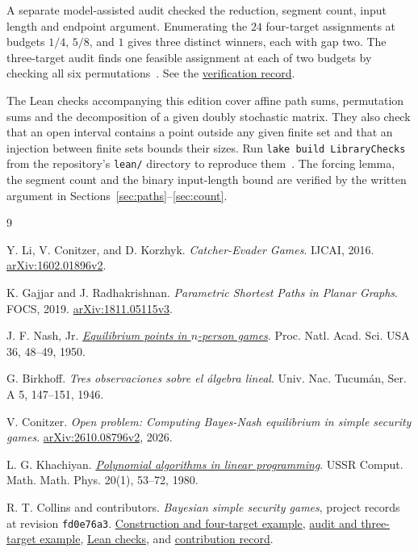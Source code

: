 \documentclass[11pt,letterpaper]{article}
\theoremstyle{definition}
\newcommand{\recordlink}[2]{\href{https://github.com/robbiemu/bayesian-simple-security-games/blob/fd0e76a3090ffaf4b3f85cd166fb57b69285d3be/#1}{#2}}
\begin{document}
A separate model-assisted audit checked the reduction, segment count,
input length and endpoint argument. Enumerating the \(24\) four-target
assignments at budgets \(1/4\), \(5/8\), and \(1\) gives three distinct
winners, each with gap two. The three-target audit finds one feasible
assignment at each of two budgets by checking all six permutations~\cite{record}.
See the \href{https://github.com/robbiemu/bayesian-simple-security-games/blob/3cbb839a967a8c81084f3cfeb496314fb3628ca9/papers/fixed-flow-continuation-lower-bound-verification.md}{verification record}.

The Lean checks accompanying this edition cover affine path sums,
permutation sums and the decomposition of a given doubly stochastic
matrix. They also check that an open interval contains a point outside any
given finite set and that an injection between finite sets bounds their
sizes. Run \texttt{lake build LibraryChecks} from the repository's
\texttt{lean/} directory to reproduce them~\cite{record}. The forcing
lemma, the segment count and the binary input-length bound are verified
by the written argument in Sections~\ref{sec:paths}--\ref{sec:count}.

\begin{thebibliography}{9}
\small
\raggedright
\setlength{\itemsep}{.25em}
Y. Li, V. Conitzer, and D. Korzhyk.
\emph{Catcher-Evader Games}. IJCAI, 2016.
\href{https://arxiv.org/pdf/1602.01896v2}{arXiv:1602.01896v2}.

K. Gajjar and J. Radhakrishnan.
\emph{Parametric Shortest Paths in Planar Graphs}. FOCS, 2019.
\href{https://arxiv.org/pdf/1811.05115v3}{arXiv:1811.05115v3}.

J. F. Nash, Jr. \href{https://doi.org/10.1073/pnas.36.1.48}{\emph{Equilibrium
points in \(n\)-person games}}. Proc. Natl. Acad. Sci. USA 36, 48--49, 1950.

G. Birkhoff. \emph{Tres observaciones sobre el \'algebra lineal}.
Univ. Nac. Tucum\'an, Ser. A 5, 147--151, 1946.

V. Conitzer. \emph{Open problem: Computing Bayes-Nash equilibrium in
simple security games}.
\href{https://arxiv.org/pdf/2610.08796v2}{arXiv:2610.08796v2}, 2026.

L. G. Khachiyan. \href{https://www.mathnet.ru/eng/zvmmf5239}{\emph{Polynomial
algorithms in linear programming}}. USSR Comput. Math. Math. Phys. 20(1), 53--72, 1980.

R. T. Collins and contributors. \emph{Bayesian simple security games},
project records at revision \texttt{fd0e76a3}.
\recordlink{notes/B3f-forced-flow-switches.md}{Construction and four-target example},
\recordlink{notes/B3g-lower-bound-audit.md}{audit and three-target example},
\recordlink{lean/README.md}{Lean checks}, and
\recordlink{records/21a3ca77-54c5-4e22-8493-9926749662d4.md}{contribution record}.
\end{thebibliography}
\end{document}
